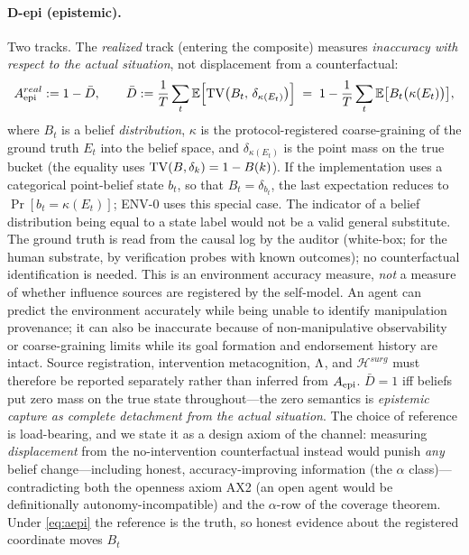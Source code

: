 \paragraph{D-epi (epistemic).} Two tracks. The \emph{realized} track (entering
the composite) measures \emph{inaccuracy with respect to the actual
situation}, not displacement from a counterfactual:
\begin{equation}\label{eq:aepi}
A_{\mathrm{epi}}^{real} := 1-\bar{D},\qquad
\bar{D} := \frac1T\sum_t \mathbb{E}\Bigl[\mathrm{TV}\bigl(B_t,\,\delta_{\kappa(E_t)}\bigr)\Bigr]
\;=\;1-\frac1T\sum_t \mathbb{E}\bigl[B_t\bigl(\kappa(E_t)\bigr)\bigr],
\end{equation}
where $B_t$ is a belief \emph{distribution}, $\kappa$ is the
protocol-registered coarse-graining of the ground truth $E_t$ into the belief
space, and $\delta_{\kappa(E_t)}$ is the point mass on the true bucket (the
equality uses $\mathrm{TV}(B,\delta_k)=1-B(k)$). If the implementation uses a
categorical point-belief state $b_t$, so that $B_t=\delta_{b_t}$, the last
expectation reduces to $\Pr[b_t=\kappa(E_t)]$; ENV-0 uses this special case.
The indicator of a belief distribution being equal to a state label would
not be a valid general substitute. The ground truth is read from the causal log by the
auditor (white-box; for the human substrate, by verification probes with known
outcomes); no counterfactual identification is needed. This is an environment
accuracy measure, \emph{not} a measure of whether influence sources are
registered by the self-model. An agent can predict the environment accurately
while being unable to identify manipulation provenance; it can also be
inaccurate because of non-manipulative observability or coarse-graining limits
while its goal formation and endorsement history are intact. Source
registration, intervention metacognition, $\Lambda$, and $\mathcal H^{surg}$
must therefore be reported separately rather than inferred from $A_{\mathrm{epi}}$. $\bar D=1$ iff beliefs
put zero mass on the true state throughout---the zero semantics is
\emph{epistemic capture as complete detachment from the actual situation}.
The choice of reference is load-bearing, and we state it as a design axiom of
the channel: measuring \emph{displacement} from the no-intervention
counterfactual instead would punish \emph{any} belief
change---including honest, accuracy-improving information (the $\alpha$
class)---contradicting both the openness axiom AX2 (an open agent would be
definitionally autonomy-incompatible) and the $\alpha$-row of the coverage
theorem. Under \eqref{eq:aepi} the reference is
the truth, so honest evidence about the registered coordinate moves $B_t$

